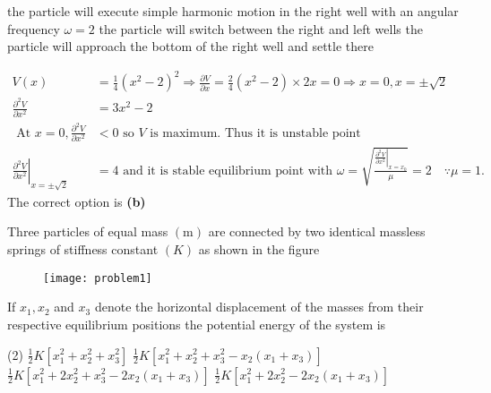 \begin{enumerate}
\begin{tasks}
		\task[\textbf{B.}]the particle will execute simple harmonic motion in the right well with an angular frequency $\omega=2$
		\task[\textbf{C.}]the particle will switch between the right and left wells
		\task[\textbf{D.}]the particle will approach the bottom of the right well and settle there
	\end{tasks}
	\begin{answer}
		\begin{align*}
		V(x)&=\frac{1}{4}\left(x^{2}-2\right)^{2} \Rightarrow \frac{\partial V}{\partial x}=\frac{2}{4}\left(x^{2}-2\right) \times 2 x=0 \Rightarrow x=0, x=\pm \sqrt{2}\\
		\frac{\partial^{2} V}{\partial x^{2}}&=3 x^{2}-2\\
		\text { At } x=0, \frac{\partial^{2} V}{\partial x^{2}}&<0 \text { so } V \text { is maximum. Thus it is unstable point }\\
		\left.\frac{\partial^{2} V}{\partial x^{2}}\right|_{x=\pm \sqrt{2}}&=4 \text { and it is stable equilibrium point with } \omega=\sqrt{\frac{\left.\frac{\partial^{2} V}{\partial x^{2}}\right|_{x=x_{0}}}{\mu}}=2 \quad \because \mu=1 \text {. }
		\end{align*}
		The correct option is \textbf{(b)}	
	\end{answer}
	\begin{minipage}{\textwidth}
		\item Three particles of equal mass $(\mathrm{m})$ are connected by two identical massless springs of stiffness constant $(K)$ as shown in the figure\\
		\begin{figure}[H]
			\centering
			\texttt{[image: problem1]}
		\end{figure}
		If $x_{1}, x_{2}$ and $x_{3}$ denote the horizontal displacement of the masses from their respective equilibrium positions the potential energy of the system is
	\end{minipage}
	\begin{tasks}(2)
		\task[\textbf{A.}] $\frac{1}{2} K\left[x_{1}^{2}+x_{2}^{2}+x_{3}^{2}\right]$
		\task[\textbf{B.}]$\frac{1}{2} K\left[x_{1}^{2}+x_{2}^{2}+x_{3}^{2}-x_{2}\left(x_{1}+x_{3}\right)\right]$
		\task[\textbf{C.}]$\frac{1}{2} K\left[x_{1}^{2}+2 x_{2}^{2}+x_{3}^{2}-2 x_{2}\left(x_{1}+x_{3}\right)\right]$
		\task[\textbf{D.}]$\frac{1}{2} K\left[x_{1}^{2}+2 x_{2}^{2}-2 x_{2}\left(x_{1}+x_{3}\right)\right]$
	\end{tasks}
	\begin{answer}

\end{answer}
\end{enumerate}
